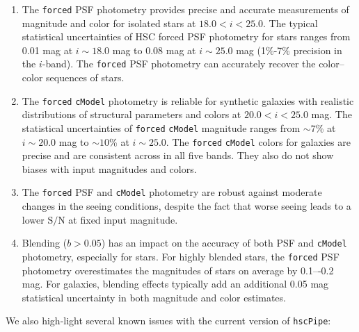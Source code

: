 \documentclass[useamsfonts]{pasj01}
\def\hscpipe{\texttt{hscPipe}}
\def\cmodel{\texttt{cModel}}
\def\forced{\texttt{forced}}
\begin{document}
    \begin{enumerate}

        \item The \forced{} PSF photometry provides precise and accurate 
            measurements of magnitude and color for isolated stars at 
            $18.0 < i < 25.0$.
            The typical statistical uncertainties of HSC forced PSF photometry for 
            stars ranges from 0.01 mag at $i{\sim}18.0$ mag to 0.08 mag at 
            $i{\sim}25.0$ mag (1\%-7\% precision in the $i$-band).
            The \forced{} PSF photometry can accurately recover the color--color
            sequences of stars.

        \item The \forced{} \cmodel{} photometry is reliable for synthetic galaxies
            with realistic distributions of structural parameters and colors at
            $20.0 < i < 25.0$ mag.
            The statistical uncertainties of \forced{} \cmodel{} magnitude ranges 
            from ${\sim}7$\% at $i{\sim}20.0$ mag to ${\sim}10$\% at $i{\sim}25.0$.
            The \forced{} \cmodel{} colors for galaxies are precise and are 
            consistent across in all five bands.
            They also do not show biases with input magnitudes and colors.

        \item The \forced{} PSF and \cmodel{} photometry are robust against 
            moderate changes in the seeing conditions, despite the fact that worse 
            seeing leads to a lower $\mathrm{S}/\mathrm{N}$ at fixed input magnitude.

        \item Blending ($b>0.05$) has an impact on the accuracy of both PSF and 
            \cmodel{} photometry, especially for stars.
            For highly blended stars, the \forced{} PSF photometry overestimates 
            the magnitudes of stars on average by 0.1–-0.2 mag.
            For galaxies, blending effects typically add an additional 0.05 mag
            statistical uncertainty in both magnitude and color estimates.
            
    \end{enumerate}
    
    \vspace{0.5cm}
    \noindent We also high-light several known issues with the current version 
    of \hscpipe{}:
\end{document}
